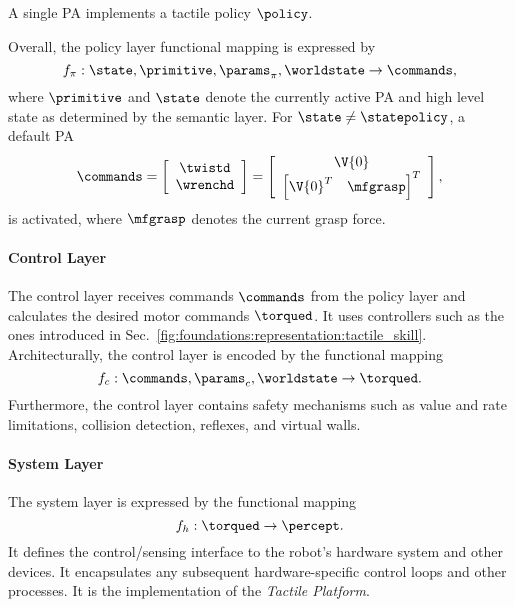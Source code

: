 A single PA implements a tactile policy $\policy$.

Overall, the policy layer functional mapping is expressed by
\begin{equation}
f_\pi: \state,\primitive,\params_\pi,\worldstate \rightarrow \commands,
\end{equation}
where $\primitive$ and $\state$ denote the currently active PA and high level state as determined by the semantic layer. For $\state \neq \statepolicy$, a default PA
\begin{equation*}
\commands=\left[\begin{array}{c}
     \twistd \\
     \wrenchd
\end{array}\right]
=\left[\begin{array}{c}
     \V{0} \\
     \left[\V{0}^T \quad \mfgrasp\right]^T
\end{array}\right],
\end{equation*}
is activated, where $\mfgrasp$ denotes the current grasp force.

\paragraph{Control Layer}
The control layer receives commands $\commands$ from the policy layer and calculates the desired motor commands $\torqued$.
It uses controllers such as the ones introduced in Sec.~\ref{fig:foundations:representation:tactile_skill}.
Architecturally, the control layer is encoded by the functional mapping
\begin{equation}
f_c: \commands,\params_c,\worldstate \rightarrow \torqued.
\end{equation}
Furthermore, the control layer contains safety mechanisms such as value and rate limitations, collision detection, reflexes, and virtual walls.

\paragraph{System Layer}
The system layer is expressed by the functional mapping
\begin{equation}
f_h:\torqued \rightarrow \percept.
\end{equation}
It defines the control/sensing interface to the robot's hardware system and other devices.
It encapsulates any subsequent hardware-specific control loops and other processes.
It is the implementation of the \emph{Tactile Platform}.

